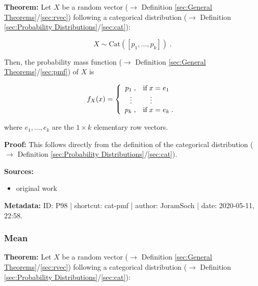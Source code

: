 \documentclass[a4paper,12pt,twoside]{book}
\begin{document}
\textbf{Theorem:} Let $X$ be a random vector ($\rightarrow$ Definition \ref{sec:General Theorems}/\ref{sec:rvec}) following a categorical distribution ($\rightarrow$ Definition \ref{sec:Probability Distributions}/\ref{sec:cat}):

\begin{equation} \label{eq:cat-pmf-cat}
X \sim \mathrm{Cat}(\left[p_1, \ldots, p_k \right]) \; .
\end{equation}

Then, the probability mass function ($\rightarrow$ Definition \ref{sec:General Theorems}/\ref{sec:pmf}) of $X$ is

\begin{equation} \label{eq:cat-pmf-cat-pmf}
f_X(x) = \left\{
\begin{array}{rl}
p_1 \; , & \text{if} \; x = e_1 \\
\vdots \; \hphantom{,} & \quad \vdots \\
p_k \; , & \text{if} \; x = e_k \; . \\
\end{array}
\right.
\end{equation}

where $e_1, \ldots, e_k$ are the $1 \times k$ elementary row vectors.


\vspace{1em}
\textbf{Proof:} This follows directly from the definition of the categorical distribution ($\rightarrow$ Definition \ref{sec:Probability Distributions}/\ref{sec:cat}).


\vspace{1em}
\textbf{Sources:}
\begin{itemize}
\item original work\end{itemize}


\vspace{1em}
\textbf{Metadata:} ID: P98 | shortcut: cat-pmf | author: JoramSoch | date: 2020-05-11, 22:58.
\vspace{1em}



\subsubsection[\textbf{Mean}]{Mean} \label{sec:cat-mean}
\setcounter{equation}{0}

\textbf{Theorem:} Let $X$ be a random vector ($\rightarrow$ Definition \ref{sec:General Theorems}/\ref{sec:rvec}) following a categorical distribution ($\rightarrow$ Definition \ref{sec:Probability Distributions}/\ref{sec:cat}):
\end{document}
